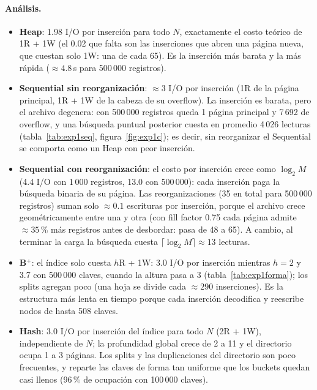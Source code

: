 \paragraph{Análisis.}
\begin{itemize}
\item \textbf{Heap}: 1.98 I/O por inserción para todo $N$, exactamente el costo teórico de 1R + 1W
  (el 0.02 que falta son las inserciones que abren una página nueva, que cuestan solo 1W: una de cada 65).
  Es la inserción más barata y la más rápida ($\approx 4.8$\,s para 500\,000 registros).
\item \textbf{Sequential sin reorganización}: $\approx 3$ I/O por inserción (1R de la página principal,
  1R + 1W de la cabeza de su overflow). La inserción es barata, pero el archivo degenera: con 500\,000
  registros queda 1 página principal y 7\,692 de overflow, y una búsqueda puntual posterior cuesta en
  promedio 4\,026 lecturas (tabla~\ref{tab:exp1seq}, figura~\ref{fig:exp1c}); es decir, sin reorganizar el
  Sequential se comporta como un Heap con peor inserción.
\item \textbf{Sequential con reorganización}: el costo por inserción crece como $\log_2 M$ (4.4 I/O con
  1\,000 registros, 13.0 con 500\,000): cada inserción paga la búsqueda binaria de su página. Las
  reorganizaciones (35 en total para 500\,000 registros) suman solo $\approx 0.1$ escrituras por
  inserción, porque el archivo crece geométricamente entre una y otra (con fill factor 0.75 cada página
  admite $\approx 35$\,\% más registros antes de desbordar: pasa de 48 a 65). A cambio, al terminar la carga la búsqueda
  cuesta $\lceil\log_2 M\rceil\approx 13$ lecturas.
\item \textbf{B$^+$}: el índice solo cuesta $h$R + 1W: 3.0 I/O por inserción mientras $h=2$ y 3.7 con
  500\,000 claves, cuando la altura pasa a 3 (tabla~\ref{tab:exp1forma}); los splits agregan poco
  (una hoja se divide cada $\approx 290$ inserciones). Es la estructura más lenta en tiempo porque cada
  inserción decodifica y reescribe nodos de hasta 508 claves.
\item \textbf{Hash}: 3.0 I/O por inserción del índice para todo $N$ (2R + 1W), independiente de $N$; la
  profundidad global crece de 2 a 11 y el directorio ocupa 1 a 3 páginas. Los splits y las
  duplicaciones del directorio son poco frecuentes, y  reparte las claves de forma tan
  uniforme que los buckets quedan casi llenos (96\,\% de ocupación con 100\,000 claves).
\end{itemize}

